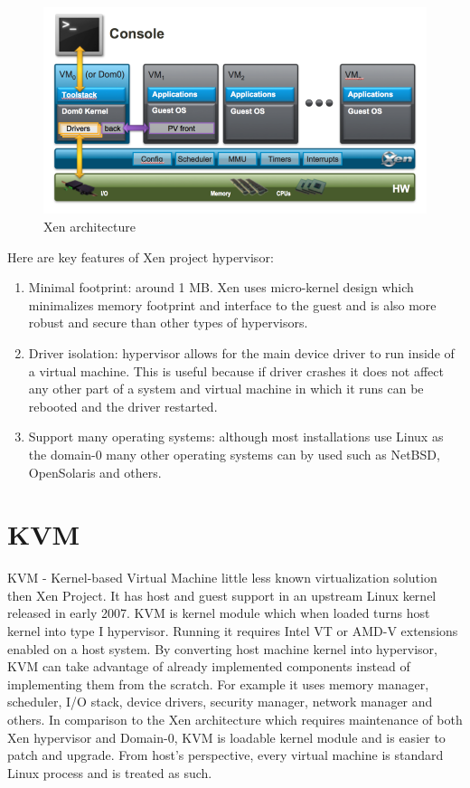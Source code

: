 \begin{figure}[H]
\centering
\includegraphics[scale=1]{xen-diagram.png}
\caption{Xen architecture}
\end{figure}

Here are key features of Xen project hypervisor:
\begin{enumerate}
\item Minimal footprint: around 1 MB. Xen uses micro-kernel design which minimalizes memory footprint and interface to the guest and is also more robust and secure than other types of hypervisors.
\item Driver isolation: hypervisor allows for the main device driver to run inside of a virtual machine. This is useful because if driver crashes it does not affect any other part of a system and virtual machine in which it runs can be rebooted and the driver restarted.
\item Support many operating systems: although most installations use Linux as the domain-0 many other operating systems can by used such as NetBSD, OpenSolaris and others.
\end{enumerate}


\section{KVM} \label{kvm}
KVM - Kernel-based Virtual Machine little less known virtualization solution then Xen Project. It has host and guest support in an upstream Linux kernel released in early 2007. KVM is kernel module which when loaded turns host kernel into type I hypervisor. Running it requires Intel VT or AMD-V extensions enabled on a host system. By converting host machine kernel into hypervisor, KVM can take advantage of already implemented components instead of implementing them from the scratch. For example it uses memory manager, scheduler, I/O stack, device drivers, security manager, network manager and others. In comparison to the Xen architecture which requires maintenance of both Xen hypervisor and Domain-0, KVM is loadable kernel module and is easier to patch and upgrade. From host's perspective, every virtual machine is standard Linux process and is treated as such.

